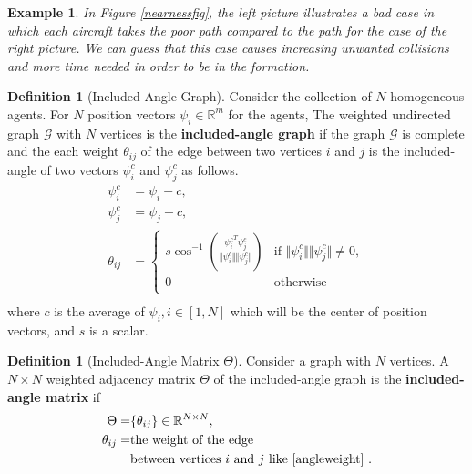 \documentclass[11pt, a4paper, oneside, openany, reqno]{book}
\newtheorem{example}{Example}
\theoremstyle{definition}
\newtheorem{definition}[theorem]{Definition}
\theoremstyle{remark}
\numberwithin{equation}{chapter} %
\newcommand{\R}{\ensuremath{{\mathbb R}}}
\newcommand{\GRP}{\mathcal{G}}
\begin{document}
\begin{example}
	In Figure \ref{nearnessfig}, 
	the left picture illustrates a bad case in which each aircraft takes the poor path
	compared to the path for the case of the right picture.
	We can guess that this case causes increasing unwanted collisions and 
	more time needed in order to be in the formation.
\end{example}

\begin{definition}[Included-Angle Graph]
	Consider the collection of $ N $ homogeneous agents.
	For $ N $ position vectors $ \psi_i \in \R^m $ for the agents,
	The weighted undirected graph $ \GRP $ with $ N $ vertices is the \textbf{included-angle graph} if
	the graph $ \GRP $ is complete and 
	the each weight $ \theta_{ij} $ of the edge between two vertices $ i $ and $ j $ is 
	the included-angle of two vectors $  \psi_i^c $ and $ \psi_j^c $ as follows.
	\begin{equation}\begin{split}\label{angleweight}
		\psi_i^c &= \psi_i - c, \\
		\psi_j^c &= \psi_j - c, \\
		\theta_{ij} &=  \begin{cases} 
			s \cos^{-1} \left( 
			\frac{	{\psi_i^c}^T \psi_j^c }{\Vert \psi_i^c \Vert \Vert \psi_j^c \Vert} \right)  
			& \text{if } \Vert \psi_i^c \Vert \Vert \psi_j^c \Vert \neq 0, \\ 
			0 & \text{otherwise} \\ \end{cases}	\\
	\end{split}\end{equation}
	where $ c $ is the average of $ \psi_i, i \in [1, N] $ 
	which will be the center of position vectors, and $ s $ is a scalar.
\end{definition}

\begin{definition}[Included-Angle Matrix $ \Theta $]	
	Consider a graph with $ N $ vertices.
	A $ N \times N $ weighted adjacency matrix $ \Theta $ of the included-angle graph is 
	the \textbf{included-angle matrix} if
	\begin{equation}\begin{split}
		\Theta =& \lbrace \theta_{ij} \rbrace \in \R^{N \times N}, \\
		\theta_{ij}=& \text{the weight of the edge} \\
			&\text{between vertices $i$ and $j$ like \eqref{angleweight} }.\\
	\end{split}\end{equation}
\end{definition}
\end{document}
